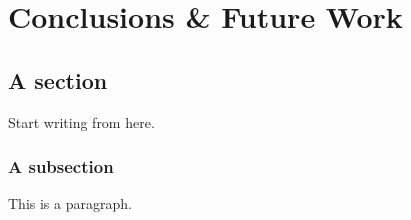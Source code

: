 \chapter{Conclusions \& Future Work}
\section{A section}
Start writing from here.
\subsection{A subsection}
This is a paragraph.
